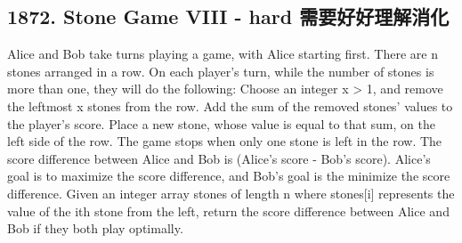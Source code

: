\documentclass[9pt, b5paaper]{book}
\begin{document}
\subsection{1872. Stone Game VIII - hard 需要好好理解消化}
\label{sec-1-1-4}
Alice and Bob take turns playing a game, with Alice starting first.
There are n stones arranged in a row. On each player's turn, while the number of stones is more than one, they will do the following:
Choose an integer x > 1, and remove the leftmost x stones from the row.
Add the sum of the removed stones' values to the player's score.
Place a new stone, whose value is equal to that sum, on the left side of the row.
The game stops when only one stone is left in the row.
The score difference between Alice and Bob is (Alice's score - Bob's score). Alice's goal is to maximize the score difference, and Bob's goal is the minimize the score difference.
Given an integer array stones of length n where stones[i] represents the value of the ith stone from the left, return the score difference between Alice and Bob if they both play optimally.
\end{document}
